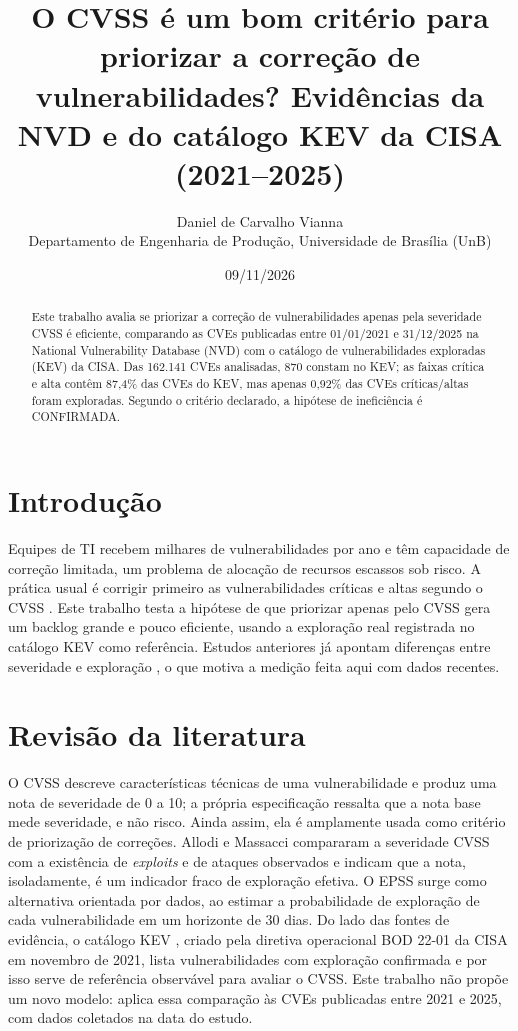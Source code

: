 \documentclass[11pt,a4paper]{article}
\title{O CVSS é um bom critério para priorizar a correção de vulnerabilidades? Evidências da NVD e do catálogo KEV da CISA (2021–2025)}
\author{Daniel de Carvalho Vianna\\ Departamento de Engenharia de Produção, Universidade de Brasília (UnB)}
\date{09/11/2026}
\begin{document}
\maketitle

\begin{abstract}
Este trabalho avalia se priorizar a correção de vulnerabilidades apenas pela severidade CVSS é eficiente, comparando as CVEs publicadas entre 01/01/2021 e 31/12/2025 na National Vulnerability Database (NVD) com o catálogo de vulnerabilidades exploradas (KEV) da CISA. Das 162.141 CVEs analisadas, 870 constam no KEV; as faixas crítica e alta contêm 87,4\% das CVEs do KEV, mas apenas 0,92\% das CVEs críticas/altas foram exploradas. Segundo o critério declarado, a hipótese de ineficiência é CONFIRMADA.
\end{abstract}

\section{Introdução}
Equipes de TI recebem milhares de vulnerabilidades por ano e têm capacidade de correção limitada, um problema de alocação de recursos escassos sob risco. A prática usual é corrigir primeiro as vulnerabilidades críticas e altas segundo o CVSS \cite{cvss}. Este trabalho testa a hipótese de que priorizar apenas pelo CVSS gera um backlog grande e pouco eficiente, usando a exploração real registrada no catálogo KEV \cite{kev} como referência. Estudos anteriores já apontam diferenças entre severidade e exploração \cite{allodi,epss}, o que motiva a medição feita aqui com dados recentes.

\section{Revisão da literatura}
O CVSS \cite{cvss} descreve características técnicas de uma vulnerabilidade e produz uma nota de severidade de 0 a 10; a própria especificação ressalta que a nota base mede severidade, e não risco. Ainda assim, ela é amplamente usada como critério de priorização de correções. Allodi e Massacci \cite{allodi} compararam a severidade CVSS com a existência de \textit{exploits} e de ataques observados e indicam que a nota, isoladamente, é um indicador fraco de exploração efetiva. O EPSS \cite{epss} surge como alternativa orientada por dados, ao estimar a probabilidade de exploração de cada vulnerabilidade em um horizonte de 30 dias. Do lado das fontes de evidência, o catálogo KEV \cite{kev}, criado pela diretiva operacional BOD 22-01 \cite{bod} da CISA em novembro de 2021, lista vulnerabilidades com exploração confirmada e por isso serve de referência observável para avaliar o CVSS. Este trabalho não propõe um novo modelo: aplica essa comparação às CVEs publicadas entre 2021 e 2025, com dados coletados na data do estudo.
\end{document}
